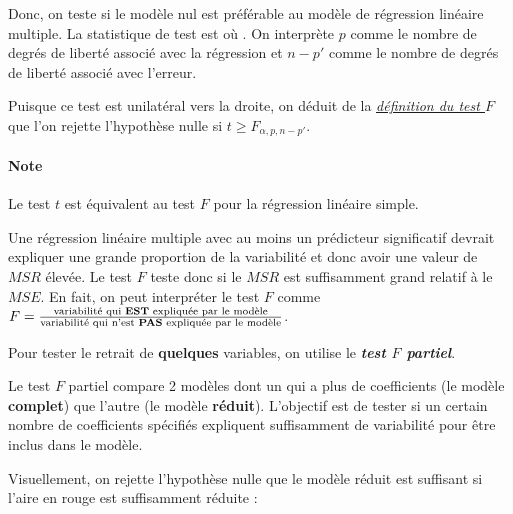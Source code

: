 \documentclass[french]{article}
\begin{document}
\begin{multicols*}{2}
\begin{definitionNOHFILL}[Test $F$]
Donc, on teste si le modèle nul est préférable au modèle de régression linéaire multiple. La statistique de test est  où . On interprète $p$ comme le nombre de degrés de liberté associé avec la régression et $n - p'$ comme le nombre de degrés de liberté associé avec l'erreur. 

\bigskip

Puisque ce test est unilatéral vers la droite, on déduit de la \textit{\color{bleudefrance}\underline{\hyperref[subsubsec:VarTest2Samples]{\color{bleudefrance} définition du test $F$}}} que l'on rejette l'hypothèse nulle si $t \geq F_{\alpha, p, n - p'}$.
\end{definitionNOHFILL}

\paragraph{Note}	Le test $t$ est équivalent au test $F$ pour la régression linéaire simple.

\bigskip

\begin{rappel_enhanced}[Contexte]
Une régression linéaire multiple avec au moins un prédicteur significatif devrait expliquer une grande proportion de la variabilité et donc avoir une valeur de $MSR$ élevée. Le test $F$ teste donc si le $MSR$ est suffisamment grand relatif à le $MSE$. En fait, on peut interpréter le test $F$ comme $F = \frac{\text{variabilité qui \textbf{EST} expliquée par le modèle}}{\text{variabilité qui n'est \textbf{PAS} expliquée par le modèle}}$.

\bigskip

Pour tester le retrait de \textbf{quelques} variables, on utilise le \textbf{\textit{test $F$ partiel}}.
\end{rappel_enhanced}


\begin{definitionNOHFILL}
Le test $F$ partiel compare 2 modèles dont un qui a plus de coefficients (le modèle \textbf{complet}) que l'autre (le modèle \textbf{réduit}). L'objectif est de tester si un certain nombre de coefficients spécifiés expliquent suffisamment de variabilité pour être inclus dans le modèle.

\bigskip

Visuellement, on rejette l'hypothèse nulle que le modèle réduit est suffisant si l'aire en rouge est suffisamment réduite : 

\begin{center}
\begin{tikzpicture}[x=0.75pt,y=0.75pt,yscale=-1,xscale=1]


\end{tikzpicture}
\end{center}
\end{definitionNOHFILL}
\end{multicols*}
\end{document}
